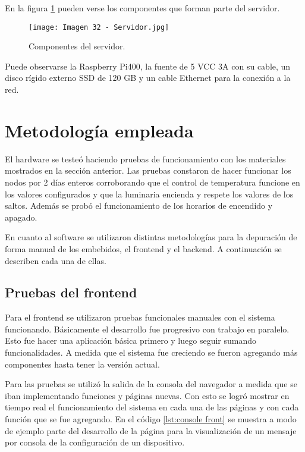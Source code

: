 En la figura \ref{fig:32} pueden verse los componentes que forman parte del servidor.

\begin{figure}[h]
\centering
\texttt{[image: Imagen 32 - Servidor.jpg]}
\caption[Servidor]{Componentes del servidor.}
\label{fig:32}
\end{figure}

Puede observarse la Raspberry Pi400, la fuente de 5 VCC 3A con su cable, un disco rígido externo SSD de 120 GB y un cable Ethernet para la conexión a la red.

\section{Metodología empleada}

El hardware se testeó haciendo pruebas de funcionamiento con los materiales mostrados en la sección anterior. Las pruebas constaron de hacer funcionar los nodos por 2 días enteros corroborando que el control de temperatura funcione en los valores configurados y que la luminaria encienda y respete los valores de los saltos. Además se probó el funcionamiento de los horarios de encendido y apagado.

En cuanto al software se utilizaron distintas metodologías para la depuración de forma manual de los embebidos, el frontend y el backend. A continuación se describen cada una de ellas.

\subsection{Pruebas del frontend}

Para el frontend se utilizaron pruebas funcionales manuales con el sistema funcionando. Básicamente el desarrollo fue progresivo con trabajo en paralelo. Esto fue hacer una aplicación básica primero y luego seguir sumando funcionalidades. A medida que el sistema fue creciendo se fueron agregando más componentes hasta tener la versión actual.

Para las pruebas se utilizó la salida de la consola del navegador a medida que se iban implementando funciones y páginas nuevas. Con esto se logró mostrar en tiempo real el funcionamiento del sistema en cada una de las páginas y con cada función que se fue agregando. En el código \ref{lst:console front} se muestra a modo de ejemplo parte del desarrollo de la página para la visualización de un mensaje por consola de la configuración de un dispositivo.

